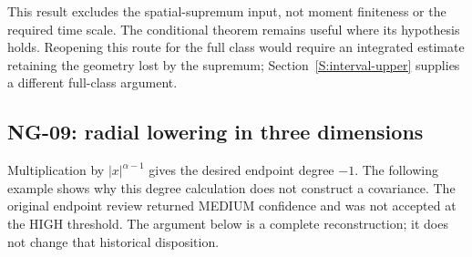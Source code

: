 This result excludes the spatial-supremum input, not moment finiteness or
the required time scale. The conditional theorem remains useful where its
hypothesis holds. Reopening this route for the full class would require
an integrated estimate retaining the geometry lost by the supremum;
Section~\ref{S:interval-upper} supplies a different full-class argument.

\subsection{NG-09: radial lowering in three dimensions}\label{S:nogo-09}

Multiplication by $|x|^{\alpha-1}$ gives the desired endpoint degree $-1$.
The following example shows why this degree calculation does not construct
a covariance. The original endpoint review returned MEDIUM confidence and
was not accepted at the HIGH threshold. The argument below is a complete
reconstruction; it does not change that historical disposition.

